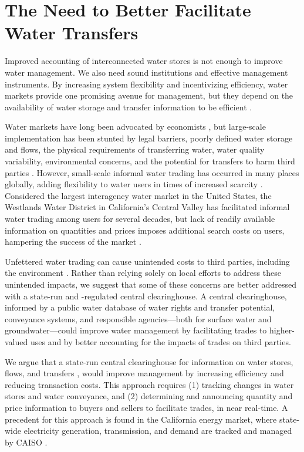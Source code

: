 \section{The Need to Better Facilitate Water Transfers}

Improved accounting of interconnected water stores is not enough to improve water management. We also need sound institutions and effective management instruments. By increasing system flexibility and incentivizing efficiency, water markets provide one promising avenue for management, but they depend on the availability of water storage and transfer information to be efficient \citep{howe_innovative_1986,easter_formal_1999}.

Water markets have long been advocated by economists \citep{howe_innovative_1986,vaux_managing_1984,dinar_agricultural_1991}, but large-scale implementation has been stunted by legal barriers, poorly defined water storage and flows, the physical requirements of transferring water, water quality variability, environmental concerns, and the potential for transfers to harm third parties \citep{chong_water_2006,regnacq_gravity_2016}. However, small-scale informal water trading has occurred in many places globally, adding flexibility to water users in times of increased scarcity \citep{easter_formal_1999}. Considered the largest interagency water market in the United States, the Westlands Water District in California’s Central Valley has facilitated informal water trading among users for several decades, but lack of readily available information on quantities and prices imposes additional search costs on users, hampering the success of the market \citep{carey_transaction_2002}.

Unfettered water trading can cause unintended costs to third parties, including the environment \citep{green_nylen_trading_2017,boyd_optimising_2004}. Rather than relying solely on local efforts to address these unintended impacts, we suggest that some of these concerns are better addressed with a state-run and -regulated central clearinghouse. A central clearinghouse, informed by a public water database of water rights and transfer potential, conveyance systems, and responsible agencies—both for surface water and groundwater—could improve water management by facilitating trades to higher-valued uses and by better accounting for the impacts of trades on third parties.

We argue that a state-run central clearinghouse for information on water stores, flows, and transfers \citep{hanak_managing_2011}, would improve management by increasing efficiency and reducing transaction costs. This approach requires (1) tracking changes in water stores and water conveyance, and (2) determining and announcing quantity and price information to buyers and sellers to facilitate trades, in near real-time. A precedent for this approach is found in the California energy market, where state-wide electricity generation, transmission, and demand are tracked and managed by CAISO \citep{albuyeh_implementation_1999,rahimi_effective_2003}.

